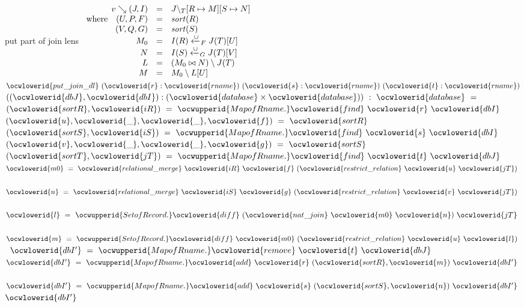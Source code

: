 \documentclass[12pt]{article}
\begin{document}
\ocwendcode{}\ocwindent{0.00em}
put part of join lens 
\ocweol
\ocwindent{0.00em}
$
  \begin{array}{rcl}
  v\searrow(J,I)       &=& J{\setminus_T}[R\mapsto M][S\mapsto N]\\
  \text{where}\quad (U,P,F) &=& \mathit{sort}(R)                  \\
                    (V,Q,G) &=& \mathit{sort}(S)                  \\
                       M_0  &=& I(R)\xleftarrow{\cup}_{F}J(T)[U]\\
                         N  &=& I(S)\xleftarrow{\cup}_{G}J(T)[V]\\
                         L  &=& (M_0 \bowtie N) \setminus J(T)\\
                         M  &=& M_0 \setminus L[U]
  \end{array}
$ 
\ocweol
\label{rellens.ml:21776}%
\medskip
\ocwbegincode{}\ocwindent{0.00em}
~$\ocwlowerid{put\_join\_dl}~(\ocwlowerid{r}:\ocwlowerid{rname})~(\ocwlowerid{s}:\ocwlowerid{rname})~(\ocwlowerid{t}:\ocwlowerid{rname})$\ocweol
\ocwindent{2.00em}
$((\ocwlowerid{dbJ},\ocwlowerid{dbI}):(\ocwlowerid{database}\times{}\ocwlowerid{database}))~:~\ocwlowerid{database}~=$\ocweol
\ocwindent{1.00em}
~$(\ocwlowerid{sortR},\ocwlowerid{iR})~=~\ocwupperid{MapofRname.}\ocwlowerid{find}~\ocwlowerid{r}~\ocwlowerid{dbI}~$\ocweol
\ocwindent{1.00em}
~$(\ocwlowerid{u},\ocwlowerid{\_},\ocwlowerid{\_},\ocwlowerid{f})~=~\ocwlowerid{sortR}~$\ocweol
\ocwindent{1.00em}
~$(\ocwlowerid{sortS},\ocwlowerid{iS})~=~\ocwupperid{MapofRname.}\ocwlowerid{find}~\ocwlowerid{s}~\ocwlowerid{dbI}~$\ocweol
\ocwindent{1.00em}
~$(\ocwlowerid{v},\ocwlowerid{\_},\ocwlowerid{\_},\ocwlowerid{g})~=~\ocwlowerid{sortS}~$\ocweol
\ocwindent{1.00em}
~$(\ocwlowerid{sortT},\ocwlowerid{jT})~=~\ocwupperid{MapofRname.}\ocwlowerid{find}~\ocwlowerid{t}~\ocwlowerid{dbJ}~$\ocweol
\ocwindent{1.00em}
~$\ocwlowerid{m0}~=~\ocwlowerid{relational\_merge}~\ocwlowerid{iR}~\ocwlowerid{f}~(\ocwlowerid{restrict\_relation}~\ocwlowerid{u}~\ocwlowerid{jT})~$\ocweol
\ocwindent{1.00em}
~$\ocwlowerid{n}~=~\ocwlowerid{relational\_merge}~\ocwlowerid{iS}~\ocwlowerid{g}~(\ocwlowerid{restrict\_relation}~\ocwlowerid{v}~\ocwlowerid{jT})~$\ocweol
\ocwindent{1.00em}
~$\ocwlowerid{l}~=~\ocwupperid{SetofRecord.}\ocwlowerid{diff}~(\ocwlowerid{nat\_join}~\ocwlowerid{m0}~\ocwlowerid{n})~\ocwlowerid{jT}~$\ocweol
\ocwindent{1.00em}
~$\ocwlowerid{m}~=~\ocwupperid{SetofRecord.}\ocwlowerid{diff}~\ocwlowerid{m0}~(\ocwlowerid{restrict\_relation}~\ocwlowerid{u}~\ocwlowerid{l})~$\ocweol
\ocwindent{1.00em}
~$\ocwlowerid{dbI'}~=~\ocwupperid{MapofRname.}\ocwlowerid{remove}~\ocwlowerid{t}~\ocwlowerid{dbJ}~$\ocweol
\ocwindent{1.00em}
~$\ocwlowerid{dbI'}~=~\ocwupperid{MapofRname.}\ocwlowerid{add}~\ocwlowerid{r}~(\ocwlowerid{sortR},\ocwlowerid{m})~\ocwlowerid{dbI'}~$\ocweol
\ocwindent{1.00em}
~$\ocwlowerid{dbI'}~=~\ocwupperid{MapofRname.}\ocwlowerid{add}~\ocwlowerid{s}~(\ocwlowerid{sortS},\ocwlowerid{n})~\ocwlowerid{dbI'}~$\ocweol
\ocwindent{1.00em}
$\ocwlowerid{dbI'}$\medskip
\end{document}
